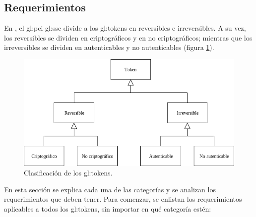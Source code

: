 %
%

\subsection{Requerimientos}

En \cite{pci_tokens}, el \gls{gl:pci} \gls{gl:ssc} divide a los
\glspl{gl:token} en reversibles e irreversibles. A su vez, los reversibles se
dividen en criptográficos y en no criptográficos; mientras que los
irreversibles se dividen en autenticables y no autenticables (figura
\ref{fig:division_tokens}).

\begin{figure}[H]
  \begin{center}
    \includegraphics[width=0.75\linewidth]
      {contenidos/analisis_y_disenio/tokens/requerimientos/diagramas/clasificacion.png}
    \caption{Clasificación de los \glspl{gl:token}.}
    \label{fig:division_tokens}
  \end{center}
\end{figure}

En esta sección se explica cada una de las categorías y se analizan los
requerimientos que deben tener. Para comenzar, se enlistan los requerimientos
aplicables a todos los \glspl{gl:token}, sin importar en qué categoría estén:


